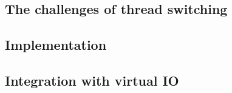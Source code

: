 \subsection{The challenges of thread switching}
\subsection{Implementation}
\subsection{Integration with virtual IO}